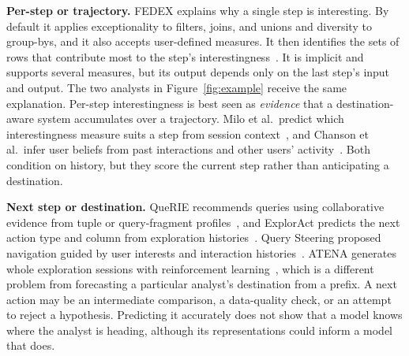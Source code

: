 \documentclass[sigconf]{acmart}
\begin{document}
\textbf{Per-step or trajectory.}
FEDEX explains why a single step is interesting. By default it applies exceptionality to filters, joins, and unions and diversity to group-bys, and it also accepts user-defined measures. It then identifies the sets of rows that contribute most to the step's interestingness~\cite{deutchFEDEXExplainabilityFramework2022}. It is implicit and supports several measures, but its output depends only on the last step's input and output. The two analysts in Figure~\ref{fig:example} receive the same explanation. Per-step interestingness is best seen as \emph{evidence} that a destination-aware system accumulates over a trajectory. Milo et al.\ predict which interestingness measure suits a step from session context~\cite{somechPredictingWhatInteresting2019}, and Chanson et al.\ infer user beliefs from past interactions and other users' activity~\cite{chanson2019belief}. Both condition on history, but they score the current step rather than anticipating a destination.

\textbf{Next step or destination.}
QueRIE recommends queries using collaborative evidence from tuple or query-fragment profiles~\cite{eirinakiQuerieCollaborativeDatabase2013}, and ExplorAct predicts the next action type and column from exploration histories~\cite{dezoysa2025exploract}. Query Steering proposed navigation guided by user interests and interaction histories~\cite{ugurcetintemelQuerySteeringInteractive2013}. ATENA generates whole exploration sessions with reinforcement learning~\cite{barelAutomaticallyGeneratingData2020}, which is a different problem from forecasting a particular analyst's destination from a prefix. A next action may be an intermediate comparison, a data-quality check, or an attempt to reject a hypothesis. Predicting it accurately does not show that a model knows where the analyst is heading, although its representations could inform a model that does.
\end{document}
